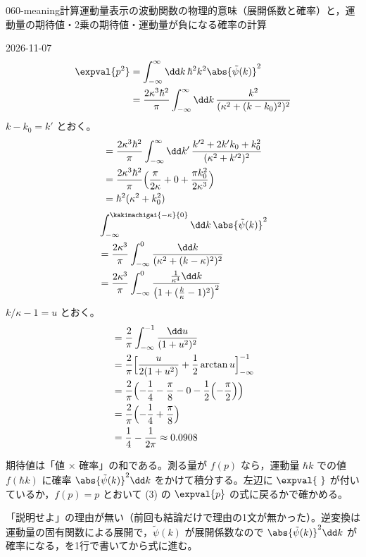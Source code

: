\documentclass[uplatex,dvipdfmx,a4paper,11pt]{jsarticle}
\begin{document}
\begin{mondai}{060-meaning}{計算}{運動量表示の波動関数の物理的意味（展開係数と確率）と，運動量の期待値・2乗の期待値・運動量が負になる確率の計算}
\begin{kotaeutsushi}{2026-11-07}
\begin{align*}
\expval{p^{2}}&=\int_{-\infty}^{\infty}\dd k\,\hbar^{2}k^{2}\abs{\tilde{\psi}(k)}^{2}\\
&=\frac{2\kappa^{3}\hbar^{2}}{\pi}\int_{-\infty}^{\infty}\dd k\,\frac{k^{2}}{(\kappa^{2}+(k-k_{0})^{2})^{2}}
\end{align*}
$k-k_{0}=k'$ とおく。
\begin{align*}
&=\frac{2\kappa^{3}\hbar^{2}}{\pi}\int_{-\infty}^{\infty}\dd k'\,\frac{k'^{2}+2k'k_{0}+k_{0}^{2}}{(\kappa^{2}+k'^{2})^{2}}\\
&=\frac{2\kappa^{3}\hbar^{2}}{\pi}\Bigl(\frac{\pi}{2\kappa}+0+\frac{\pi k_{0}^{2}}{2\kappa^{3}}\Bigr)\\
&=\hbar^{2}(\kappa^{2}+k_{0}^{2})
\end{align*}
\begin{align*}
&\int_{-\infty}^{\kakimachigai{-\kappa}{0}}\dd k\,\abs{\tilde{\psi}(k)}^{2}\\
&=\frac{2\kappa^{3}}{\pi}\int_{-\infty}^{0}\frac{\dd k}{(\kappa^{2}+(k-\kappa)^{2})^{2}}\\
&=\frac{2\kappa^{3}}{\pi}\int_{-\infty}^{0}\frac{\frac{1}{\kappa^{4}}\dd k}{\bigl(1+(\frac{k}{\kappa}-1)^{2}\bigr)^{2}}
\end{align*}
$k/\kappa-1=u$ とおく。
\begin{align*}
&=\frac{2}{\pi}\int_{-\infty}^{-1}\frac{\dd u}{(1+u^{2})^{2}}\\
&=\frac{2}{\pi}\Bigl[\frac{u}{2(1+u^{2})}+\frac{1}{2}\arctan u\Bigr]_{-\infty}^{-1}\\
&=\frac{2}{\pi}\Bigl(-\frac{1}{4}-\frac{\pi}{8}-0-\frac{1}{2}\Bigl(-\frac{\pi}{2}\Bigr)\Bigr)\\
&=\frac{2}{\pi}\Bigl(-\frac{1}{4}+\frac{\pi}{8}\Bigr)\\
&=\frac{1}{4}-\frac{1}{2\pi}\approx0.0908
\end{align*}
\end{kotaeutsushi}
\begin{kizuki}
\item 期待値は「値 $\times$ 確率」の和である。測る量が $f(p)$ なら，運動量 $\hbar k$ での値 $f(\hbar k)$ に確率 $\abs{\tilde{\psi}(k)}^{2}\dd k$ をかけて積分する。左辺に $\expval{\ }$ が付いているか，$f(p)=p$ とおいて (3) の $\expval{p}$ の式に戻るかで確かめる。
\item {} 「説明せよ」の理由が無い（前回も結論だけで理由の1文が無かった）。逆変換は運動量の固有関数による展開で，$\tilde{\psi}(k)$ が展開係数なので $\abs{\tilde{\psi}(k)}^{2}\dd k$ が確率になる，を1行で書いてから式に進む。

\end{kizuki}
\end{mondai}
\end{document}
